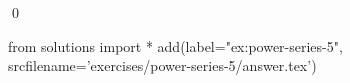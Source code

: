 \begin{ex}
  \label{ex:power-series-5}
  
  \qed
\end{ex}
\begin{python0}
from solutions import *
add(label="ex:power-series-5",
    srcfilename='exercises/power-series-5/answer.tex') 
\end{python0}                              
